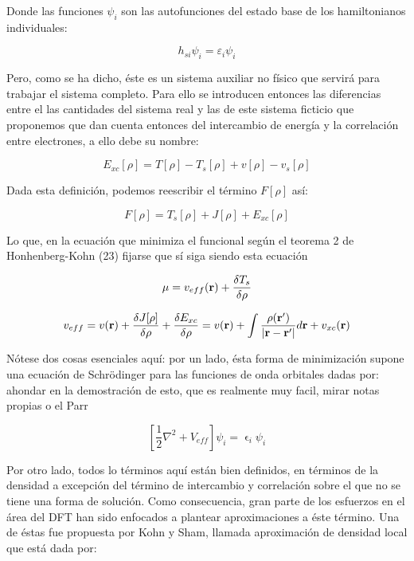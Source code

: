 \documentclass [11pt]{article}
\begin{document}
Donde las funciones $\psi_i$ son las autofunciones del estado base de los hamiltonianos individuales:

\begin{equation}
    h_{si}\psi_i=\varepsilon_i\psi_i
\end{equation}

Pero, como se ha dicho, éste es un sistema auxiliar no físico que servirá para trabajar el sistema completo. Para ello se introducen entonces las diferencias entre el las cantidades del sistema real y las de este sistema ficticio que proponemos que dan cuenta entonces del intercambio de energía y la correlación entre electrones, a ello debe su nombre:

\begin{equation}
     E_{xc}[\rho]=T[\rho]-T_s[\rho]+v[\rho]-v_s[\rho]
\end{equation}

Dada esta definición, podemos reescribir el término $F[\rho]$ así:

\begin{equation}
	F[\rho]=T_s[\rho]+J[\rho]+E_{xc}[\rho]
\end{equation}

Lo que, en la ecuación que minimiza el funcional según el teorema 2 de Honhenberg-Kohn {\color{magenta} (23) fijarse que sí siga siendo esta ecuación}

\begin{equation}
	\mu=v_{eff}({\bf r})+\frac{\delta T_s}{\delta \rho}
\end{equation}

\begin{equation}
	v_{eff}=v({\bf r})+\frac{\delta J[\rho]}{\delta \rho}+\frac{\delta E_{xc}}{\delta \rho}=v({\bf r})+\int\frac{\rho({\bf r'})}{|{\bf r-r'}|}d{\bf r}+v_{xc}(\bf r)
\end{equation}

Nótese dos cosas esenciales aquí: por un lado, ésta forma de minimización supone una ecuación de Schrödinger para las funciones de onda orbitales dadas por:{\color{magenta} ahondar en la demostración de esto, que es realmente muy facil, mirar notas propias o el Parr} 

\begin{equation}
	\left[\frac{1}{2}\nabla^2+V_{eff}\right]\psi_i=\upvarepsilon_i \psi_i
\end{equation}

Por otro lado, todos lo términos aquí están bien definidos, en términos de la densidad a excepción del término de intercambio y correlación sobre el que no se tiene una forma de solución. Como consecuencia, gran parte de los esfuerzos en el área del DFT han sido enfocados a plantear aproximaciones a éste término. Una de éstas fue propuesta por Kohn y Sham, llamada aproximación de densidad local que está dada por:
\end{document}
